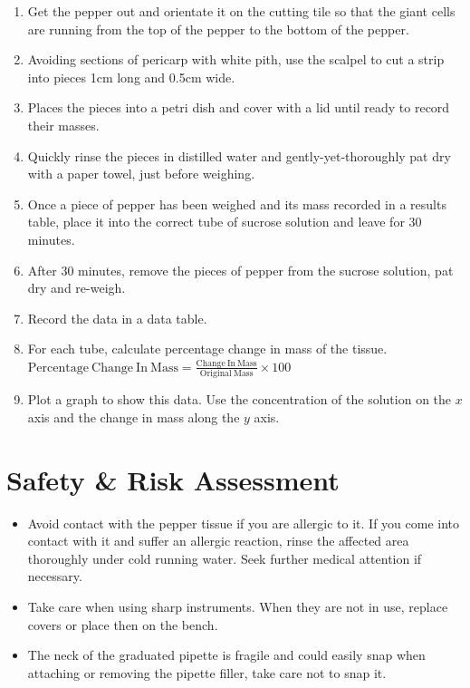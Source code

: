 \documentclass{thomasClass}
\begin{document}
\begin{enumerate}
    \item Get the pepper out and orientate it on the cutting tile so that the giant cells are running from the top of the pepper to the bottom of the pepper.
    \item Avoiding sections of pericarp with white pith, use the scalpel to cut a strip into pieces 1cm long and 0.5cm wide.
    \item Places the pieces into a petri dish and cover with a lid until ready to record their masses.
    \item Quickly rinse the pieces in distilled water and gently-yet-thoroughly pat dry with a paper towel, just before weighing.
    \item Once a piece of pepper has been weighed and its mass recorded in a results table, place it into the correct tube of sucrose solution and leave for 30 minutes.
    \item After 30 minutes, remove the pieces of pepper from the sucrose solution, pat dry and re-weigh.
    \item Record the data in a data table.
    \item For each tube, calculate percentage change in mass of the tissue.\\
    $\displaystyle \mathrm{Percentage\ Change\ In\ Mass} = \frac{\mathrm{Change\ In\ Mass}}{\mathrm{Original\ Mass}} \times 100$
    \item Plot a graph to show this data. Use the concentration of the solution on the $x$ axis and the change in mass along the $y$ axis.
\end{enumerate}

\section{Safety \& Risk Assessment}
\begin{itemize}
    \item Avoid contact with the pepper tissue if you are allergic to it. If you come into contact with it and suffer an allergic reaction, rinse the affected area thoroughly under cold running water. Seek further medical attention if necessary.
    \item Take care when using sharp instruments. When they are not in use, replace covers or place then on the bench.
    \item The neck of the graduated pipette is fragile and could easily snap when attaching or removing the pipette filler, take care not to snap it.
\end{itemize}
\end{document}
